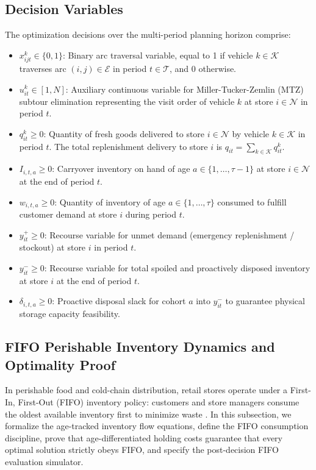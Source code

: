 \documentclass[11pt,a4paper]{article}
\theoremstyle{definition}
\theoremstyle{remark}
\begin{document}
\subsection{Decision Variables}
The optimization decisions over the multi-period planning horizon comprise:
\begin{itemize}[leftmargin=*]
    \item $x_{ijt}^k \in \{0, 1\}$: Binary arc traversal variable, equal to 1 if vehicle $k \in \mathcal{K}$ traverses arc $(i, j) \in \mathcal{E}$ in period $t \in \mathcal{T}$, and 0 otherwise.
    \item $u_{it}^k \in [1, N]$: Auxiliary continuous variable for Miller-Tucker-Zemlin (MTZ) subtour elimination representing the visit order of vehicle $k$ at store $i \in \mathcal{N}$ in period $t$.
    \item $q_{it}^k \ge 0$: Quantity of fresh goods delivered to store $i \in \mathcal{N}$ by vehicle $k \in \mathcal{K}$ in period $t$. The total replenishment delivery to store $i$ is $q_{it} = \sum_{k \in \mathcal{K}} q_{it}^k$.
    \item $I_{i,t,a} \ge 0$: Carryover inventory on hand of age $a \in \{1, \dots, \tau-1\}$ at store $i \in \mathcal{N}$ at the end of period $t$.
    \item $w_{i,t,a} \ge 0$: Quantity of inventory of age $a \in \{1, \dots, \tau\}$ consumed to fulfill customer demand at store $i$ during period $t$.
    \item $y_{it}^+ \ge 0$: Recourse variable for unmet demand (emergency replenishment / stockout) at store $i$ in period $t$.
    \item $y_{it}^- \ge 0$: Recourse variable for total spoiled and proactively disposed inventory at store $i$ at the end of period $t$.
    \item $\delta_{i,t,a} \ge 0$: Proactive disposal slack for cohort $a$ into $y_{it}^-$ to guarantee physical storage capacity feasibility.
\end{itemize}

\subsection{FIFO Perishable Inventory Dynamics and Optimality Proof}
\label{sec:fifo_dynamics}

In perishable food and cold-chain distribution, retail stores operate under a First-In, First-Out (FIFO) inventory policy: customers and store managers consume the oldest available inventory first to minimize waste \citep{nahmias1982perishable,coelho2014optimal}. In this subsection, we formalize the age-tracked inventory flow equations, define the FIFO consumption discipline, prove that age-differentiated holding costs guarantee that every optimal solution strictly obeys FIFO, and specify the post-decision FIFO evaluation simulator.
\end{document}

